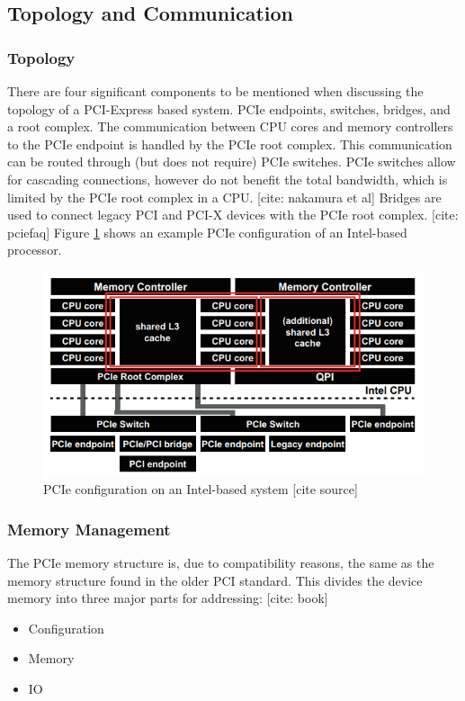\subsection{Topology and Communication}

\subsubsection{Topology}
There are four significant components to be mentioned when discussing the topology of a PCI-Express based system. PCIe endpoints, switches, bridges, and a root complex. 
The communication between CPU cores and memory controllers to the PCIe endpoint is handled by the PCIe root complex. This communication can be routed through (but does not require) PCIe switches. PCIe switches allow for cascading connections, however do not benefit the total bandwidth, which is limited by the PCIe root complex in a CPU. [cite: nakamura et al] 
Bridges are used to connect legacy PCI and PCI-X devices with the PCIe root complex. [cite: pciefaq]
Figure \ref{fig:topology} shows an example PCIe configuration of an Intel-based processor.

\begin{figure}
\includegraphics[width = \linewidth]{figures/PCIE-topology}
\caption{PCIe configuration on an Intel-based system [cite source]}
\label{fig:topology}
\end{figure}
\subsubsection{Memory Management}

The PCIe memory structure is, due to compatibility reasons, the same as the memory structure found in the older PCI standard. This divides the device memory into three major parts for addressing: [cite: book]
\begin{itemize}
\item Configuration
\item Memory
\item IO
\end{itemize}

